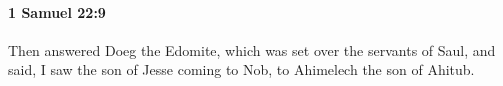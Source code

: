 
		\paragraph{1 Samuel 22:9} %
			\label{1SAMUEL-22-9}

			Then answered Doeg the Edomite, which was set over the servants of Saul, and said, I saw the son of Jesse coming to Nob, to Ahimelech the son of Ahitub.


